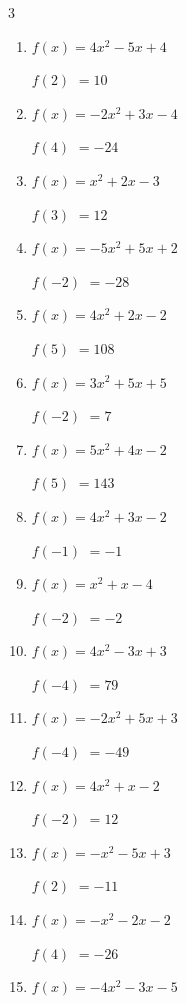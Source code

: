 \begin{multicols}{3}
\begin{enumerate}
$f(1)$
        $= -9$

\columnbreak %

  \item $f(x)=4x^{2}-5x+4$

$f(2)$
        $= 10$

  \item $f(x)=-2x^{2}+3x-4$

$f(4)$
        $= -24$

  \item $f(x)=x^{2}+2x-3$

$f(3)$
        $= 12$

  \item $f(x)=-5x^{2}+5x+2$

$f(-2)$
        $= -28$

  \item $f(x)=4x^{2}+2x-2$

$f(5)$
        $= 108$

  \item $f(x)=3x^{2}+5x+5$

$f(-2)$
        $= 7$

  \item $f(x)=5x^{2}+4x-2$

$f(5)$
        $= 143$

  \item $f(x)=4x^{2}+3x-2$

$f(-1)$
        $= -1$

  \item $f(x)=x^{2}+x-4$

$f(-2)$
        $= -2$

  \item $f(x)=4x^{2}-3x+3$

$f(-4)$
        $= 79$

  \item $f(x)=-2x^{2}+5x+3$

$f(-4)$
        $= -49$

  \item $f(x)=4x^{2}+x-2$

$f(-2)$
        $= 12$

  \item $f(x)=-x^{2}-5x+3$

$f(2)$
        $= -11$

  \item $f(x)=-x^{2}-2x-2$

$f(4)$
        $= -26$

  \item $f(x)=-4x^{2}-3x-5$


\end{enumerate}
\end{multicols}
